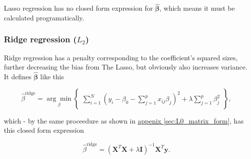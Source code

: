 \documentclass[../main.tex]{subfiles}
\begin{document}
Lasso regression has no closed form expression for $\hat{\mathbf \beta}$, which means it must be calculated programatically.


\subsubsection{Ridge regression ($L_2$)}
Ridge regression has a penalty corresponding to the coefficient's squared sizes, further decreasing the bias from The Lasso, but obviously also increases variance. It defines $\hat{\mathbf \beta}$ like this

\begin{equation*}
  \hat \beta^{\text{ridge}} = \underset{\beta}{\arg \min} \begin{Bmatrix}\sum_{i=1}^N\left(y_i - \beta_0 - \sum_{j=1}^p x_{ij}\beta_j\right)^2 + \lambda \sum_{j=1}^p \beta_j^2 \end{Bmatrix},
\end{equation*}

which - by the same proceedure as shown in \hyperref[sec:L0_matrix_form]{appenix \ref*{sec:L0_matrix_form}}, has this closed form expression

\begin{equation}
  \hat \beta^{\text{ridge}} = (\mathbf X^T\mathbf X + \lambda \mathbf I)^{-1}\mathbf X^T\mathbf y.
\end{equation}
\end{document}
